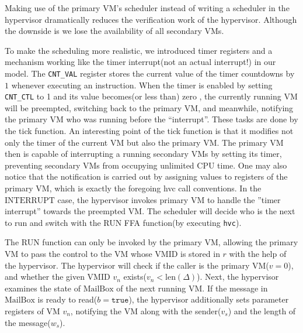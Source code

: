 \documentclass[a4paper]{article}
\newcommand*{\VMID}{\text{VMID}}
\newcommand*{\MB}{\text{MailBox}}
\newcommand*{\INT}{\text{INTERRUPT}}
\newcommand*{\instr}[1]{\texttt{#1}}
\begin{document}
Making use of the primary VM's scheduler instead of writing a scheduler in the
hypervisor dramatically reduces the verification work of the hypervisor. Although
the downside is we lose the availability of all secondary VMs.

To make the scheduling more realistic, we introduced timer registers and a
mechanism working like the timer interrupt(not an actual interrupt!) in our
model. The \texttt{CNT\_VAL} register stores the current value of the
timer countdowns by $1$ whenever executing an instruction. When the timer is
enabled by setting \texttt{CNT\_CTL} to 1 and its value becomes(or less than)
zero , the currently running VM will be preempted, switching back to the primary
VM, and meanwhile, notifying the primary VM who was running before the
``interrupt''. These tasks are done by the tick function. An interesting point
of the tick function is that it modifies not only the timer of the current VM but
also the primary VM. The primary VM then is capable of interrupting a running
secondary VMs by setting its timer, preventing secondary VMs from occupying
unlimited CPU time. One may also notice that the notification is carried out by
assigning values to registers of the primary VM, which is exactly the foregoing hvc
call conventions.
In the $\INT$ case, the hypervisor invokes primary VM to handle the ''timer
interrupt'' towards the preempted VM. The scheduler will decide who is the next
to run and switch with the RUN FFA function(by executing \instr{hvc}).


The RUN function can only be invoked by the primary VM, allowing the primary VM to pass
the control to the VM whose $\VMID$ is stored in $r$ with the help of the
hypervisor. The hypervisor will check if the caller is the primary VM($v=0$),
and whether the given $\VMID$ $v_{n}$ exists($v_{n} < \text{len}(\Delta)$).
Next, the hypervisor examines the state of $\MB$ of the next running VM. If the
message in $\MB$ is ready to read($b=\mathtt{true}$), the hypervisor
additionally sets parameter registers of VM $v_{n}$, notifying the VM along with
the sender($v_{s}$) and the length of the message($w_{s}$).
\end{document}
